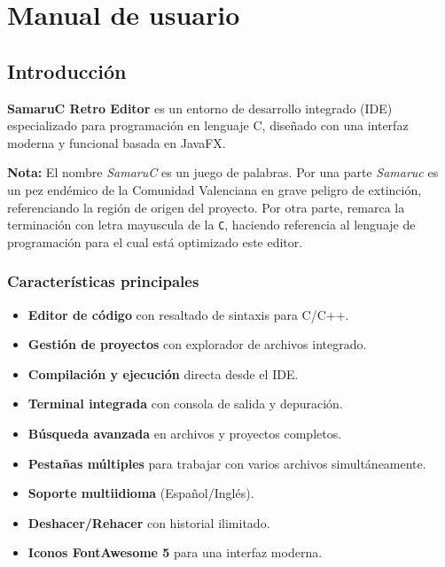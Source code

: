 \documentclass[../../main.tex]{subfiles}
\begin{document}
\chapter{Manual de usuario}


\section{Introducción}
\textbf{SamaruC Retro Editor} es un entorno de desarrollo integrado (IDE) especializado para programación en lenguaje C, diseñado con una interfaz moderna y funcional basada en JavaFX.

\par{\textbf{Nota:} El nombre \textit{SamaruC} es un juego de palabras. Por una parte \textit{Samaruc} es un pez endémico de la Comunidad Valenciana en grave peligro de extinción, referenciando la región de origen del proyecto. Por otra parte, remarca la terminación con letra mayuscula de la \lstinline|C|, haciendo referencia al lenguaje de programación para el cual está optimizado este editor.}

\subsection{Características principales}
\begin{itemize}
    \item \textbf{Editor de código} con resaltado de sintaxis para C/C++.
    \item \textbf{Gestión de proyectos} con explorador de archivos integrado.
    \item \textbf{Compilación y ejecución} directa desde el IDE.
    \item \textbf{Terminal integrada} con consola de salida y depuración.
    \item \textbf{Búsqueda avanzada} en archivos y proyectos completos.
    \item \textbf{Pestañas múltiples} para trabajar con varios archivos simultáneamente.
    \item \textbf{Soporte multiidioma} (Español/Inglés).
    \item \textbf{Deshacer/Rehacer} con historial ilimitado.
    \item \textbf{Iconos FontAwesome 5} para una interfaz moderna.
\end{itemize}
\end{document}
